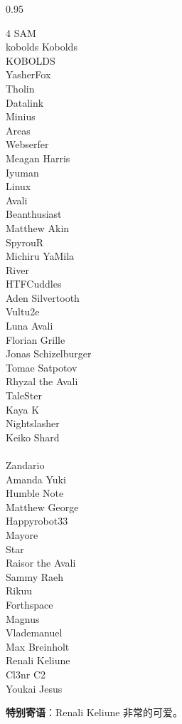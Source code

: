 {\begin{spacing}{0.95}
\begin{multicols}{4}
		SAM \\
		kobolds Kobolds \\
		KOBOLDS \\
		YasherFox \\
		Tholin \\
		Datalink \\
		Minius \\
		Areas \\
		Webserfer \\
		Meagan Harris \\
		Iyuman \\
		Linux \\
		Avali \\
		Beanthusiast \\
		Matthew Akin \\
		SpyrouR \\
		Michiru Ya\textquotesingle{}Mila \\
		River \\
		HTFCuddles \\
		Aden Silvertooth \\
		Vultu2e \\
		Luna Avali \\
		Florian Grille \\
		Jonas Schizelburger \\
		Tomae Satpotov \\
		Rhyzal the Avali \\
		TaleSter \\
		Kaya K \\
		Nightslasher \\
		Keiko Shard \\
		 \\
		Zandario \\
		Amanda Yuki \\
		Humble Note \\
		Matthew George \\
		Happyrobot33 \\
		Mayore \\
		Star \\
		Raisor the Avali \\
		Sammy Raeh \\
		Rikuu \\
		Forthspace \\
		Magnus \\
		Vlademanuel \\
		Max Breinholt \\
		Renali Keliune \\
		Cl3nr C2 \\
		Youkai Jesus
	\end{multicols}
\end{spacing}

\vfill
{\textbf{特别寄语}：Renali Keliune 非常的可爱。}
}

\clearpage
